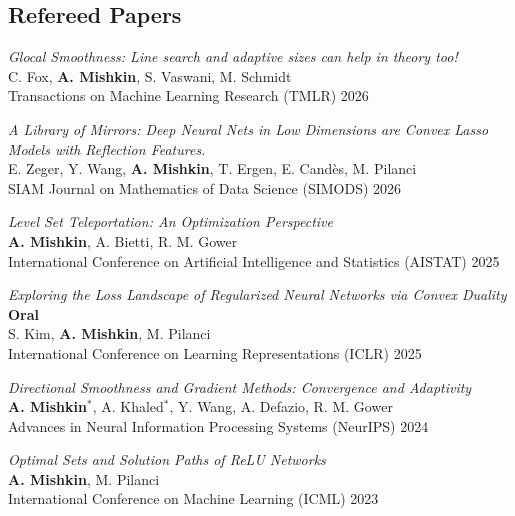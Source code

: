 \documentclass[11pt, a4paper]{article}
\makeatletter
\gdef\tshortstack{\@ifnextchar[\@tshortstack{\@tshortstack[c]}}
\gdef\@tshortstack[#1]{%
  \leavevmode
  \vtop\bgroup
    \baselineskip-\p@\lineskip 3\p@
    \let\mb@l\hss\let\mb@r\hss
    \expandafter\let\csname mb@#1\endcsname\relax
    \let\\\@stackcr
    \@ishortstack}
\newcommand{\mitem}[1]{\item[\smash{\tshortstack[l]{#1}}]}
\newcommand{\mleftsize}{4.75em}
\makeatother
\begin{document}
\subsection{Refereed Papers}
\begin{description}[leftmargin=\mleftsize,style=nextline,font=\normalfont\space]
    \mitem{2026\\[.25em] TMLR}
    \textit{Glocal Smoothness: Line search and adaptive sizes can help in theory too!}\\
    C. Fox, \textbf{A. Mishkin}, S. Vaswani, M. Schmidt\\
    Transactions on Machine Learning Research (TMLR) 2026

    \mitem{2026\\[.25em] SIMODS}
    \textit{A Library of Mirrors: Deep Neural Nets in Low Dimensions are Convex
        Lasso Models with Reflection Features.}\\
    E. Zeger, Y. Wang, \textbf{A. Mishkin}, T. Ergen, E. Candès, M.  Pilanci\\
    SIAM Journal on Mathematics of Data Science (SIMODS) 2026

    \mitem{2025\\[.25em] AISTATS}
    \textit{Level Set Teleportation: An Optimization Perspective}\\
    {\bf A. Mishkin}, A. Bietti, R. M. Gower\\
    International Conference on Artificial Intelligence and Statistics (AISTAT) 2025
    \hfill

    \mitem{2025\\[.25em] ICLR}
    \textit{Exploring the Loss Landscape of Regularized Neural Networks via Convex Duality}
    \hfill {\bf Oral}
    \\
    S. Kim, {\bf A. Mishkin}, M. Pilanci\\
    International Conference on Learning Representations (ICLR) 2025

    \mitem{2024\\[.25em] NeurIPS}
    \textit{Directional Smoothness and Gradient Methods: Convergence and Adaptivity}\\
    {\bf A. Mishkin}$^*$, A. Khaled$^*$, Y. Wang, A. Defazio, R. M. Gower\\
    Advances in Neural Information Processing Systems (NeurIPS) 2024

    \mitem{2023\\[.25em] ICML}
    \textit{Optimal Sets and Solution Paths of ReLU Networks}\\
    {\bf A. Mishkin}, M. Pilanci\\
    International Conference on Machine Learning (ICML) 2023


\end{description}
\end{document}
